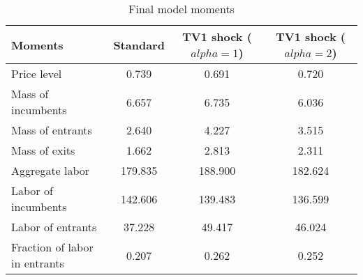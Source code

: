 
    \begin{table}\caption{Final model moments}
\centering
    \begin{tabular}{lccc}
    \toprule
    	 Moments & Standard & TV1 shock ($alpha=1$) & TV1 shock ($alpha=2$) \\
    	 \hline
    Price level & 0.739 & 0.691 & 0.720\\
	Mass of incumbents & 6.657 & 6.735 & 6.036\\
	Mass of entrants & 2.640 & 4.227 & 3.515\\
	Mass of exits & 1.662 & 2.813 & 2.311\\
	Aggregate labor & 179.835 & 188.900 & 182.624\\
	Labor of incumbents & 142.606 & 139.483 & 136.599\\
	Labor of entrants & 37.228 & 49.417 & 46.024\\
	Fraction of labor in entrants & 0.207 & 0.262 & 0.252\\

    \bottomrule
    \end{tabular}
    \end{table}